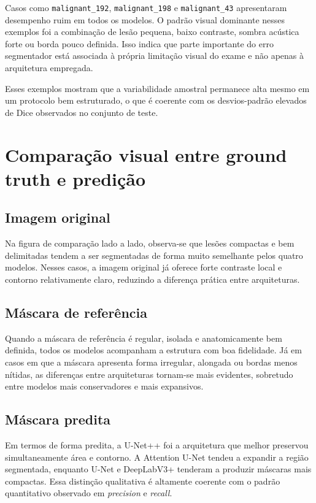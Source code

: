 \documentclass[tcc,capa]{texufpel}
\begin{document}
Casos como \texttt{malignant\_192}, \texttt{malignant\_198} e \texttt{malignant\_43} apresentaram desempenho ruim em todos os modelos. O padrão visual dominante nesses exemplos foi a combinação de lesão pequena, baixo contraste, sombra acústica forte ou borda pouco definida. Isso indica que parte importante do erro segmentador está associada à própria limitação visual do exame e não apenas à arquitetura empregada.

Esses exemplos mostram que a variabilidade amostral permanece alta mesmo em um protocolo bem estruturado, o que é coerente com os desvios-padrão elevados de Dice observados no conjunto de teste.

\section{Comparação visual entre ground truth e predição}

\subsection{Imagem original}

Na figura de comparação lado a lado, observa-se que lesões compactas e bem delimitadas tendem a ser segmentadas de forma muito semelhante pelos quatro modelos. Nesses casos, a imagem original já oferece forte contraste local e contorno relativamente claro, reduzindo a diferença prática entre arquiteturas.

\subsection{Máscara de referência}

Quando a máscara de referência é regular, isolada e anatomicamente bem definida, todos os modelos acompanham a estrutura com boa fidelidade. Já em casos em que a máscara apresenta forma irregular, alongada ou bordas menos nítidas, as diferenças entre arquiteturas tornam-se mais evidentes, sobretudo entre modelos mais conservadores e mais expansivos.

\subsection{Máscara predita}

Em termos de forma predita, a U-Net++ foi a arquitetura que melhor preservou simultaneamente área e contorno. A Attention U-Net tendeu a expandir a região segmentada, enquanto U-Net e DeepLabV3+ tenderam a produzir máscaras mais compactas. Essa distinção qualitativa é altamente coerente com o padrão quantitativo observado em \textit{precision} e \textit{recall}.
\end{document}
